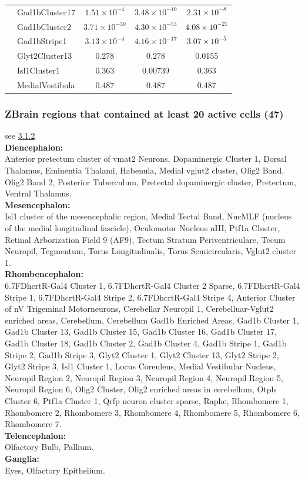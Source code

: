 \documentclass[12pt, a4paper, oneside]{article}
\begin{document}
\begin{table}[ht]
\begin{tabular}{llccc}
		& Gad1bCluster17    & $1.51\times10^{-4}$ & $3.48\times10^{-10}$ & $2.31\times10^{-8}$ \\
		& Gad1bCluster2     & $3.71\times10^{-30}$ & $4.30\times10^{-53}$ & $4.08\times10^{-21}$ \\
		& Gad1bStripe1      & $3.13\times10^{-4}$ & $4.16\times10^{-17}$ & $3.07\times10^{-5}$ \\
		& Glyt2Cluster13    & 0.278 & 0.278 & 0.0155 \\
		& Isl1Cluster1      & 0.363 & 0.00739 & 0.363 \\
		& MedialVestibula   & 0.487 & 0.487 & 0.487 \\
		\hline
	\end{tabular}
\end{table}
\clearpage
\subsubsection*{\footnotesize ZBrain regions that contained at least 20 active cells (47)}
\label{sec:list of regions}
{
	\footnotesize
	see \hyperref[sec:activity ages]{3.1.2}\\
	\textbf{Diencephalon:}\\
	Anterior pretectum cluster of vmat2 Neurons, Dopaminergic Cluster 1, Dorsal Thalamus, Eminentia Thalami, Habenula, Medial vglut2 cluster, Olig2 Band, Olig2 Band 2, Posterior Tuberculum, Pretectal dopaminergic cluster, Pretectum, Ventral Thalamus.\\
	\textbf{Mesencephalon:}\\
	Isl1 cluster of the mesencephalic region, Medial Tectal Band, NucMLF (nucleus of the medial longitudinal fascicle), Oculomotor Nucleus nIII, Ptf1a Cluster, Retinal Arborization Field 9 (AF9), Tectum Stratum Periventriculare, Tecum Neuropil, Tegmentum, Torus Longitudinalis, Torus Semicircularis, Vglut2 cluster 1.\\
	\textbf{Rhombencephalon:}\\
	6.7FDhcrtR-Gal4 Cluster 1, 6.7FDhcrtR-Gal4 Cluster 2 Sparse, 6.7FDhcrtR-Gal4 Stripe 1, 6.7FDhcrtR-Gal4 Stripe 2, 6.7FDhcrtR-Gal4 Stripe 4, Anterior Cluster of nV Trigeminal Motorneurons, Cerebellar Neuropil 1, Cerebelluar-Vglut2 enriched areas, Cerebellum, Cerebellum Gad1b Enriched Areas, Gad1b Cluster 1, Gad1b Cluster 13, Gad1b Cluster 15, Gad1b Cluster 16, Gad1b Cluster 17, Gad1b Cluster 18, Gad1b Cluster 2, Gad1b Cluster 4, Gad1b Stripe 1, Gad1b Stripe 2, Gad1b Stripe 3, Glyt2 Cluster 1, Glyt2 Cluster 13, Glyt2 Stripe 2, Glyt2 Stripe 3, Isl1 Cluster 1, Locus Coreuleus, Medial Vestibular Nucleus, Neuropil Region 2, Neuropil Region 3, Neuropil Region 4, Neuropil Region 5, Neuropil Region 6, Olig2 Cluster, Olig2 enriched areas in cerebellum, Otpb Cluster 6, Ptf1a Cluster 1, Qrfp neuron cluster sparse, Raphe, Rhombomere 1, Rhombomere 2, Rhombomere 3, Rhombomere 4, Rhombomere 5, Rhombomere 6, Rhombomere 7.\\
	\textbf{Telencephalon:}\\
	Olfactory Bulb, Pallium.\\
	\textbf{Ganglia:}\\
	Eyes, Olfactory Epithelium.\\
}
\end{document}
